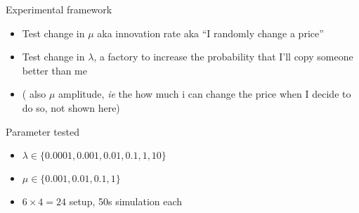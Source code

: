 \documentclass[12pt, notes=show]{beamer}
\begin{document}
\begin{frame}{ Experimental framework}
    \begin{itemize}
	\item Test change in $\mu$ aka innovation rate aka ``I randomly change a price''
	\item Test change in $\lambda$, a factory to increase the probability that I'll copy someone better than me
	\item ( also $\mu$ amplitude, \emph{ie} the how much i can change the price when I decide to do so, not shown here)
    \end{itemize}
\end{frame}
\begin{frame}{Parameter tested}
    \begin{itemize}
	\item $\lambda \in \{0.0001,0.001,0.01,0.1,1,10\}$
	\item $\mu \in \{0.001,0.01,0.1,1\}$
	\item  $ 6 \times 4 = 24$ setup, 50s simulation each
    \end{itemize}
\end{frame}
\end{document}
